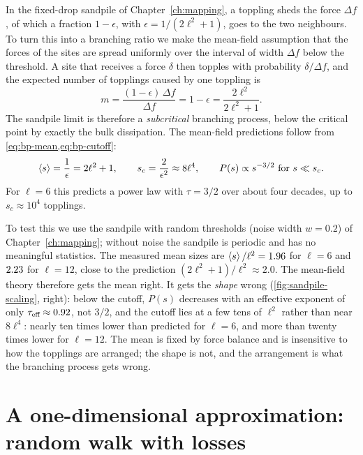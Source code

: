 In the fixed-drop sandpile of Chapter~\ref{ch:mapping}, a toppling sheds the force $\Delta f$, of which a fraction $1-\epsilon$, with
$\epsilon = 1/(2\ell^2+1)$, goes to the two neighbours. To turn this into a branching ratio we make the mean-field assumption that the forces of the
sites are spread uniformly over the interval of width $\Delta f$ below the threshold. A site that receives a force $\delta$ then topples with
probability $\delta/\Delta f$, and the expected number of topplings caused by one toppling is
\begin{equation}
  m = \frac{(1-\epsilon)\,\Delta f}{\Delta f} = 1-\epsilon = \frac{2\ell^2}{2\ell^2+1}.
\end{equation}
The sandpile limit is therefore a \emph{subcritical} branching process, below the critical point by exactly the bulk dissipation. The mean-field
predictions follow from \cref{eq:bp-mean,eq:bp-cutoff}:
\begin{equation}
  \left\langle s \right\rangle = \frac1\epsilon = 2\ell^2+1,\qquad s_c = \frac{2}{\epsilon^2}\approx 8\ell^4,
  \qquad P(s)\propto s^{-3/2}\ \text{for}\ s\ll s_c .
  \label{eq:bp-sandpile}
\end{equation}
For $\ell=6$ this predicts a power law with $\tau = 3/2$ over about four decades, up to $s_c\approx10^4$ topplings.

To test this we use the sandpile with random thresholds (noise width $w = 0.2$) of Chapter~\ref{ch:mapping}; without noise the sandpile is periodic
and has no meaningful statistics. The measured mean sizes are $\left\langle s \right\rangle/\ell^2 = 1.96$ for $\ell=6$ and $2.23$ for $\ell = 12$, close to
the prediction $(2\ell^2+1)/\ell^2\approx2.0$. The mean-field theory therefore gets the mean right. It gets the \emph{shape} wrong
(\cref{fig:sandpile-scaling}, right): below the cutoff, $P(s)$ decreases with an effective exponent of only $\tau_{\text{eff}}\approx0.92$, not $3/2$, and the
cutoff lies at a few tens of $\ell^2$ rather than near $8\ell^4$: nearly ten times lower than predicted for $\ell=6$, and more than twenty times lower for $\ell = 12$. The mean is
fixed by force balance and is insensitive to how the topplings are arranged; the shape is not, and the arrangement is what the branching process gets wrong.

\section{A one-dimensional approximation: random walk with losses}
\label{sec:th-randomwalk}

